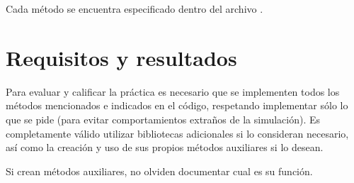 \noindent Cada método se encuentra especificado dentro del archivo .


\section{Requisitos y resultados}

Para evaluar y calificar la práctica es necesario que se implementen todos los métodos mencionados e indicados en el código, respetando implementar sólo lo que se pide (para evitar comportamientos extraños de la simulación).
Es completamente válido utilizar bibliotecas adicionales si lo consideran necesario, así como la creación y uso de sus propios métodos auxiliares si lo desean.

Si crean métodos auxiliares, no olviden documentar cual es su función.




